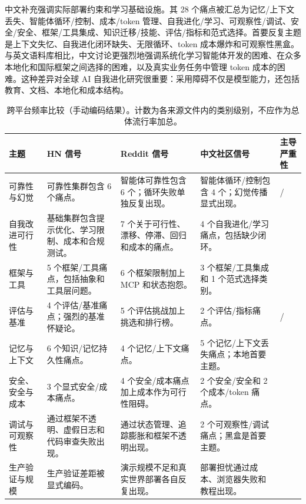 中文补充强调实际部署约束和学习基础设施。其 28 个痛点被汇总为记忆/上下文丢失、智能体循环/控制、成本/token 管理、自我进化/学习、可观察性/调试、安全/安全、框架/工具集成、知识迁移/技能、评估/指标和范式选择。首要反复主题是上下文失忆、自我进化闭环缺失、无限循环、token 成本爆炸和可观察性黑盒。与英文语料库相比，中文讨论更强烈地强调系统化学习智能体开发的困难、在众多本地化和国际框架之间选择的困难，以及真实业务任务中管理 token 成本的困难。这种差异对全球 AI 自我进化研究很重要：采用障碍不仅是模型能力，还包括教育、文档、本地化和成本结构。

\begin{table}[t]
\centering
\scriptsize
\setlength{\tabcolsep}{2pt}
\renewcommand{\arraystretch}{1.08}
\caption{跨平台频率比较（手动编码结果）。计数为各来源文件内的类别级别，不应作为总体流行率加总。}
\label{tab:platform-frequency}
\begin{tabularx}{\textwidth}{@{}L{0.20\textwidth}L{0.18\textwidth}L{0.18\textwidth}L{0.18\textwidth}Y@{}}
\toprule
\textbf{主题} & \textbf{HN 信号} & \textbf{Reddit 信号} & \textbf{中文社区信号} & \textbf{主导严重性} \\
\midrule
可靠性与幻觉 & 可靠性集群包含 6 个痛点。 & 智能体可靠性包含 6 个；循环失败单独反复出现。 & 智能体循环/控制包含 4 个；幻觉传播显式出现。 & \sevcritical{}/\sevhigh{} \\
自我改进可行性 & 基础集群包含提示优化、学习限制、成本和合规测试。 & 7 个关于可行性、漂移、停滞、回归和成本的痛点。 & 4 个自我进化/学习痛点，包括缺少闭环。 & \sevcritical{} \\
框架与工具 & 5 个框架/工具痛点，包括抽象和工具层问题。 & 6 个框架限制加上 MCP 和状态抱怨。 & 3 个框架/工具集成和 1 个范式选择类别。 & \sevhigh{} \\
评估与基准 & 4 个评估/基准痛点；强烈的基准怀疑论。 & 5 个评估挑战加上挑选和排行榜。 & 2 个评估/指标痛点。 & \sevcritical{}/\sevhigh{} \\
记忆与上下文 & 6 个知识/记忆持久性痛点。 & 4 个记忆/上下文痛点。 & 5 个记忆/上下文丢失痛点；本地首要主题。 & \sevhigh{} \\
安全、安全与成本 & 3 个显式安全/成本痛点。 & 4 个安全/成本痛点加上成本作为可行性阻碍。 & 2 个安全/安全和 2 个成本/token 痛点。 & \sevcritical{} \\
调试与可观察性 & 通过框架不透明、虚假日志和代码审查失败出现。 & 通过状态管理、追踪膨胀和框架不透明出现。 & 2 个可观察性/调试痛点；黑盒是首要主题。 & \sevhigh{} \\
生产验证与规模 & 生产验证差距被显式编码。 & 演示规模不足和真实世界部署各自反复出现。 & 部署担忧通过成本、浏览器失败和教程出现。 & \sevhigh{} \\
\bottomrule
\end{tabularx}
\end{table}

